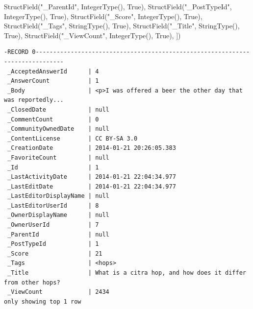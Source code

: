 \documentclass[
  letterpaper,
  DIV=11,
  numbers=noendperiod]{scrreprt}
\newenvironment{Shaded}{\begin{snugshade}}{\end{snugshade}}
\newcommand{\NormalTok}[1]{\textcolor[rgb]{0.00,0.23,0.31}{#1}}
\newcommand{\StringTok}[1]{\textcolor[rgb]{0.13,0.47,0.30}{#1}}
\newcommand{\VariableTok}[1]{\textcolor[rgb]{0.07,0.07,0.07}{#1}}
\begin{document}
\begin{Shaded}
\begin{Highlighting}[]
\NormalTok{    StructField(}\StringTok{"\_ParentId"}\NormalTok{, IntegerType(), }\VariableTok{True}\NormalTok{),}
\NormalTok{    StructField(}\StringTok{"\_PostTypeId"}\NormalTok{, IntegerType(), }\VariableTok{True}\NormalTok{),}
\NormalTok{    StructField(}\StringTok{"\_Score"}\NormalTok{, IntegerType(), }\VariableTok{True}\NormalTok{),}
\NormalTok{    StructField(}\StringTok{"\_Tags"}\NormalTok{, StringType(), }\VariableTok{True}\NormalTok{),}
\NormalTok{    StructField(}\StringTok{"\_Title"}\NormalTok{, StringType(), }\VariableTok{True}\NormalTok{),}
\NormalTok{    StructField(}\StringTok{"\_ViewCount"}\NormalTok{, IntegerType(), }\VariableTok{True}\NormalTok{),}
\NormalTok{])}
\end{Highlighting}
\end{Shaded}

\begin{verbatim}
-RECORD 0------------------------------------------------------------------------------
 _AcceptedAnswerId      | 4                                                            
 _AnswerCount           | 1                                                            
 _Body                  | <p>I was offered a beer the other day that was reportedly... 
 _ClosedDate            | null                                                         
 _CommentCount          | 0                                                            
 _CommunityOwnedDate    | null                                                         
 _ContentLicense        | CC BY-SA 3.0                                                 
 _CreationDate          | 2014-01-21 20:26:05.383                                      
 _FavoriteCount         | null                                                         
 _Id                    | 1                                                            
 _LastActivityDate      | 2014-01-21 22:04:34.977                                      
 _LastEditDate          | 2014-01-21 22:04:34.977                                      
 _LastEditorDisplayName | null                                                         
 _LastEditorUserId      | 8                                                            
 _OwnerDisplayName      | null                                                         
 _OwnerUserId           | 7                                                            
 _ParentId              | null                                                         
 _PostTypeId            | 1                                                            
 _Score                 | 21                                                           
 _Tags                  | <hops>                                                       
 _Title                 | What is a citra hop, and how does it differ from other hops? 
 _ViewCount             | 2434                                                         
only showing top 1 row
\end{verbatim}
\end{document}
